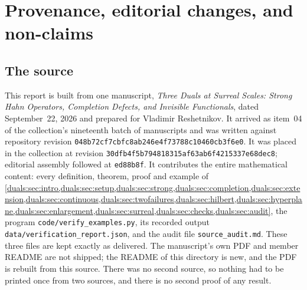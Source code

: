 \documentclass[11pt,letterpaper]{article}
\numberwithin{equation}{section}
\theoremstyle{definition}
\theoremstyle{remark}
\newcommand{\Commit}{048b72cf7cbfc8ab246e4f73788c10460cb3f6e0}
\newcommand{\PlaceCommit}{30dfb4f5b794818315af63ab6f4215337e68dec8}
\begin{document}
\appendix
\section{Provenance, editorial changes, and non-claims}
\label{duals:app:provenance}

\subsection{The source}
This report is built from one manuscript, \emph{Three Duals at Surreal
Scales: Strong Hahn Operators, Completion Defects, and Invisible
Functionals}, dated September~22, 2026 and prepared for Vladimir
Reshetnikov. It arrived as item~04 of the collection's nineteenth batch
of manuscripts and was written against repository revision
\texttt{\Commit}. It was placed in the collection at revision
\texttt{\PlaceCommit}; editorial assembly followed at \texttt{ed88b8f}.
It contributes the entire mathematical content:
every definition, theorem, proof and example of
\cref{duals:sec:intro,duals:sec:setup,duals:sec:strong,duals:sec:completion,duals:sec:extension,duals:sec:continuous,duals:sec:twofailures,duals:sec:hilbert,duals:sec:hyperplane,duals:sec:enlargement,duals:sec:surreal,duals:sec:checks,duals:sec:audit},
the program \texttt{code/verify\_examples.py}, its recorded output
\texttt{data/verification\_report.json}, and the audit file
\texttt{source\_audit.md}. These three files are kept exactly as
delivered. The manuscript's own PDF and member README are not shipped;
the README of this directory is new, and the PDF is rebuilt from this
source. There was no second source, so nothing had to be printed once
from two sources, and there is no second proof of any result.
\end{document}
